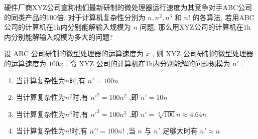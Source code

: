 \documentclass[../../main.tex]{subfiles}
\begin{document}
\begin{problem}
硬件厂商XYZ公司宣称他们最新研制的微处理器运行速度为其竞争对手ABC公司的同类产品的100倍.
对于计算机复杂性分别为 $n , n^2 , n^3$ 和 $n!$ 的各算法,
若用ABC公司的计算机在1h内分别能解输入规模为 $n$ 问题,
那么用XYZ公司的计算机在1h内分别能解输入规模为多大的问题?
\end{problem}


\begin{solution}

    设 ABC 公司研制的微型处理器的运算速度为 $x$ ,
    则 XYZ 公司研制的微型处理器的运算速度为 $100x$ .
    令 XYZ 公司的计算机在1h内分别能解的问题规模为 $n'$ .
    \begin{enumerate}
        \item 当计算复杂性为$n$时,有 $n' = 100n$
        \item 当计算复杂性为$n^2$时,有 ${n'}^2 = 100{n}^2$ ,即 $n' = 10n$
        \item 当计算复杂性为$n^3$时,有 ${n'}^3 = 100{n}^3$ ,即 $n' = \sqrt[3]{100}n\approx{4.64n}$
        \item 当计算复杂性为$n!$时,有 ${n'}! = 100{n}!$ ,当 $n$ 与 $n'$ 足够大时有 $n′ \approx {n}$
    \end{enumerate}

\end{solution}
\end{document}
